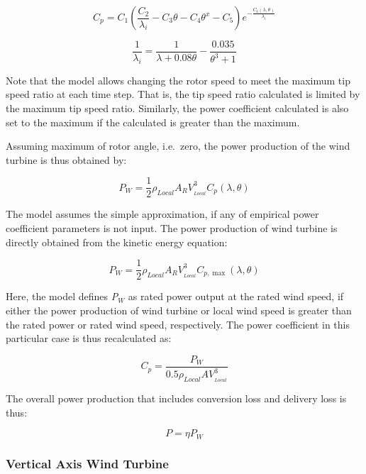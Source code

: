 \begin{equation}
{C_p} = {C_1}(\frac{{{C_2}}}{{{\lambda_i}}} - {C_3}\theta  - {C_4}{\theta ^x} - {C_5}){e^{ - \frac{{{C_6}(\lambda ,\theta )}}{{{\lambda_i}}}}}
\end{equation}

\begin{equation}
\frac{1}{{{\lambda_i}}} = \frac{1}{{\lambda  + 0.08\theta }} - \frac{{0.035}}{{{\theta ^3} + 1}}
\end{equation}

Note that the model allows changing the rotor speed to meet the maximum tip speed ratio at each time step. That is, the tip speed ratio calculated is limited by the maximum tip speed ratio. Similarly, the power coefficient calculated is also set to the maximum if the calculated is greater than the maximum.

Assuming maximum of rotor angle, i.e.~zero, the power production of the wind turbine is thus obtained by:

\begin{equation}
{P_W} = \frac{1}{2}{\rho_{Local}}{A_R}V_{_{Local}}^3{C_p}(\lambda ,\theta )
\end{equation}

The model assumes the simple approximation, if any of empirical power coefficient parameters is not input. The power production of wind turbine is directly obtained from the kinetic energy equation:

\begin{equation}
{P_W} = \frac{1}{2}{\rho_{Local}}{A_R}V_{_{Local}}^3{C_{p,\max }}(\lambda ,\theta )
\end{equation}

Here, the model defines \emph{P\(_{W}\)} as rated power output at the rated wind speed, if either the power production of wind turbine or local wind speed is greater than the rated power or rated wind speed, respectively. The power coefficient in this particular case is thus recalculated as:

\begin{equation}
{C_p} = \frac{{{P_W}}}{{0.5{\rho_{Local}}AV_{_{Local}}^3}}
\end{equation}

The overall power production that includes conversion loss and delivery loss is thus:

\begin{equation}
P = \eta {P_W}
\end{equation}

\subsubsection{Vertical Axis Wind Turbine}\label{vertical-axis-wind-turbine}

